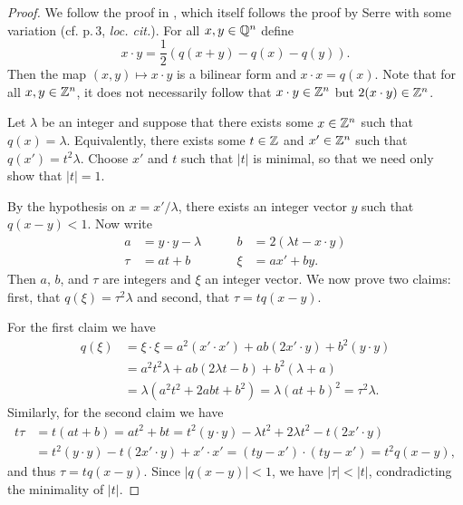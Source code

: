 \begin{proof}
    We follow the proof in \cite[p.\,2]{clark2011representation}, which itself follows the proof by Serre with some variation (cf. p.\,3, \emph{loc. cit.}). For all \(x, y \in \mathbb{Q}^n\) define
    \[
        x \cdot y = \frac{1}{2} \left( q(x + y) - q(x) - q(y) \right).
    \]
    Then the map \((x, y) \mapsto x \cdot y\) is a bilinear form and \(x \cdot x = q(x)\). Note that for all \(x, y \in \mathbb{Z}^n\), it does not necessarily follow that \(x \cdot y \in \mathbb{Z}^n\) but \(2(x \cdot y) \in \mathbb{Z}^n\).

    Let \(\lambda\) be an integer and suppose that there exists some \(x \in \mathbb{Z}^n\) such that \(q(x) = \lambda\). Equivalently, there exists some \(t \in \mathbb{Z}\) and \(x' \in \mathbb{Z}^n\) such that \(q(x') = t^2 \lambda\). Choose \(x'\) and \(t\) such that \(|t|\) is minimal, so that we need only show that \(|t| = 1\).
    
    By the hypothesis on \(x = x'/\lambda\), there exists an integer vector \(y\) such that \(q(x - y) < 1\). Now write
    \begin{align*}
        a &= y \cdot y - \lambda \qquad &b &= 2(\lambda t - x \cdot y) \\
        \tau &= at + b\qquad &\xi &= ax' + by.
    \end{align*}
    Then \(a\), \(b\), and \(\tau\) are integers and \(\xi\) an integer vector. We now prove two claims: first, that \(q(\xi) = \tau^2\lambda\) and second, that \(\tau = tq(x - y)\).
    
    For the first claim we have
    \begin{align*}
        q(\xi) &= \xi \cdot \xi = a^2 (x' \cdot x') + ab(2x' \cdot y) + b^2(y \cdot y) \\
               &= a^2 t^2 \lambda + ab(2\lambda t - b) + b^2(\lambda + a) \\
               &= \lambda (a^2 t^2 + 2abt + b^2) = \lambda (at + b)^2 = \tau^2 \lambda.
    \end{align*}
    Similarly, for the second claim we have
    \begin{align*}
        t\tau &= t(at + b) = at^2 + bt = t^2 (y \cdot y) - \lambda t^2 + 2\lambda t^2 - t(2x' \cdot y)\\
        &= t^2(y \cdot y) - t(2x' \cdot y) + x' \cdot x' = (ty-x') \cdot (ty-x') = t^2 q(x - y),
    \end{align*}
    and thus \(\tau = tq(x - y)\). Since \(|q(x - y)| < 1\), we have \(|\tau| < |t|\), condradicting the minimality of \(|t|\).
\end{proof}

